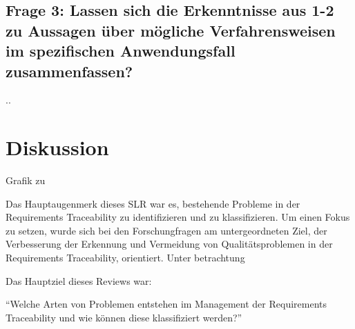\subsection{Frage 3: Lassen sich die Erkenntnisse aus 1-2 zu Aussagen über mögliche Verfahrensweisen im spezifischen Anwendungsfall zusammenfassen?}
..

\section{Diskussion}

Grafik zu

Das Hauptaugenmerk dieses SLR war es, bestehende Probleme in der Requirements Traceability zu identifizieren und zu klassifizieren. Um einen Fokus zu setzen, wurde sich bei den Forschungfragen am untergeordneten Ziel, der Verbesserung der Erkennung und Vermeidung von Qualitätsproblemen in der Requirements Traceability, orientiert. Unter betrachtung 

Das Hauptziel dieses Reviews war:

\begin{center}
\enquote{Welche Arten von Problemen entstehen im Management der Requirements Traceability und wie können diese klassifiziert werden?}
\end{center}